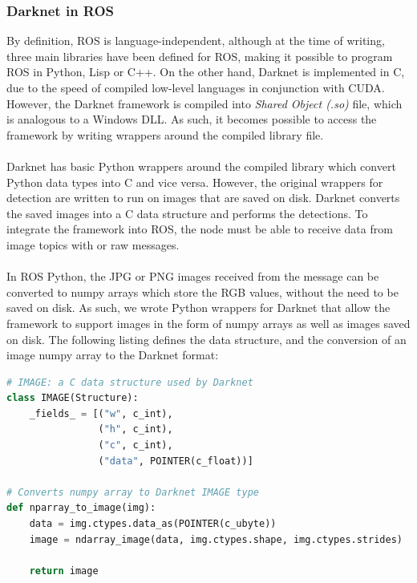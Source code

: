 \subsubsection{Darknet in ROS}
By definition, ROS is language-independent, although at the time of writing, three main libraries have been defined for ROS, making it possible to program ROS in Python, Lisp or C++. On the other hand, Darknet is implemented in C, due to the speed of compiled low-level languages in conjunction with CUDA. However, the Darknet framework is compiled into \textit{Shared Object (.so)} file, which is analogous to a Windows DLL. As such, it becomes possible to access the framework by writing wrappers around the compiled library file.

\paragraph{}Darknet has basic Python wrappers around the compiled library which convert Python data types into C and vice versa. However, the original wrappers for detection are written to run on images that are saved on disk. Darknet converts the saved images into a C data structure  and performs the detections. To integrate the framework into ROS, the node must be able to receive data from image topics with  or raw  messages.

\paragraph{}In ROS Python, the JPG or PNG images received from the  message can be converted to numpy arrays which store the RGB values, without the need to be saved on disk. As such, we wrote Python wrappers for Darknet that allow the framework to support images in the form of numpy arrays as well as images saved on disk. The following listing defines the  data structure, and the conversion of an image numpy array to the Darknet format: \\



\begin{lstlisting}[language=Python, caption={Darknet IMAGE Python wrappers for seamless ROS integration.}]
# IMAGE: a C data structure used by Darknet
class IMAGE(Structure): 
	_fields_ = [("w", c_int),
				("h", c_int),
				("c", c_int),
				("data", POINTER(c_float))]
				
# Converts numpy array to Darknet IMAGE type
def nparray_to_image(img): 
	data = img.ctypes.data_as(POINTER(c_ubyte))
	image = ndarray_image(data, img.ctypes.shape, img.ctypes.strides)

	return image
\end{lstlisting}

